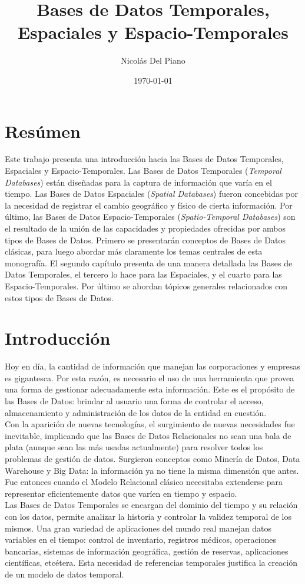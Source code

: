 \documentclass[a4paper,12pt,oneside]{report}
\title{Bases de Datos Temporales, Espaciales y Espacio-Temporales}
\date{\today}
\author{Nicol\'as Del Piano}
\date{}
\newcommand{\mychapter}[2]{
    \setcounter{chapter}{#1}
    \setcounter{section}{0}
    \chapter*{#2}
    \addcontentsline{toc}{chapter}{#2}
}
\begin{document}
\maketitle
\tableofcontents
\newpage

\mychapter{0}{Res\'umen}
Este trabajo presenta una introducci\'on hacia las Bases de Datos Temporales, Espaciales y Espacio-Temporales. Las Bases de Datos Temporales (\textit{Temporal Databases}) est\'an dise\~nadas para la captura de informaci\'on que var\'ia en el tiempo. Las Bases de Datos Espaciales (\textit{Spatial Databases}) fueron concebidas por la necesidad de registrar el cambio geogr\'afico y f\'isico de cierta informaci\'on. Por \'ultimo, las Bases de Datos Espacio-Temporales (\textit{Spatio-Temporal Databases}) son el resultado de la uni\'on de las capacidades y propiedades ofrecidas por ambos tipos de Bases de Datos. Primero se presentar\'an conceptos de Bases de Datos cl\'asicas, para luego abordar m\'as claramente los temas centrales de esta monograf\'ia. El segundo cap\'itulo presenta de una manera detallada las Bases de Datos Temporales, el tercero lo hace para las Espaciales, y el cuarto para las Espacio-Temporales. Por \'ultimo se abordan t\'opicos generales relacionados con estos tipos de Bases de Datos.
\mychapter{1}{Introducci\'on}
Hoy en d\'ia, la cantidad de informaci\'on que manejan las corporaciones y empresas es gigantesca. Por esta raz\'on, es necesario el uso de una herramienta que provea una forma de gestionar adecuadamente esta informaci\'on. Este es el prop\'osito de las Bases de Datos: brindar al usuario una forma de controlar el acceso, almacenamiento y administraci\'on de los datos de la entidad en cuesti\'on.\\
Con la aparici\'on de nuevas tecnolog\'ias, el surgimiento de nuevas necesidades fue inevitable, implicando que las Bases de Datos Relacionales no sean una bala de plata (aunque sean las m\'as usadas actualmente) para resolver todos los problemas de gesti\'on de datos. Surgieron conceptos como Miner\'ia de Datos, Data Warehouse y Big Data: la informaci\'on ya no tiene la misma dimensi\'on que antes. Fue entonces cuando el Modelo Relacional cl\'asico necesitaba extenderse para representar eficientemente datos que var\'ien en tiempo y espacio.\\
Las Bases de Datos Temporales se encargan del dominio del tiempo y su relaci\'on con los datos, permite analizar la historia y controlar la validez temporal de los mismos. Una gran variedad de aplicaciones del mundo real manejan datos variables en el tiempo: control de inventario, registros m\'edicos, operaciones bancarias, sistemas de informaci\'on geogr\'afica, gesti\'on de reservas, aplicaciones cient\'ificas, etc\'etera. Esta necesidad de referencias temporales justifica la creaci\'on de un modelo de datos temporal.\\
\end{document}
